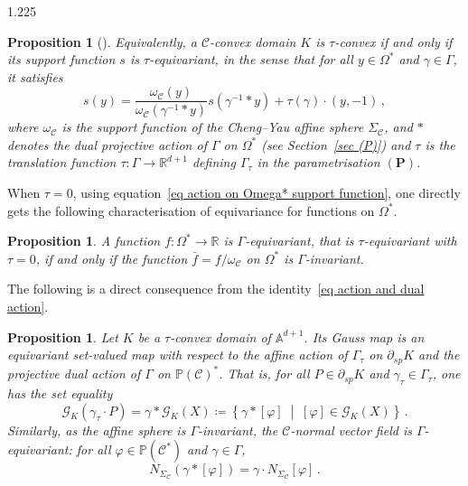 \documentclass[reqno, a4paper]{amsart}
\numberwithin{equation}{section}
\numberwithin{figure}{section}
\newtheorem{proposition}[theorem]{Proposition}
\theoremstyle{definition}
\theoremstyle{remark}
\newcommand{\R}{\mathbb{R}} %
\newcommand{\A}{\mathbb{A}} %
\renewcommand{\P}{\mathbb{P}} %
\newcommand{\C}{\mathcal{C}} %
\renewcommand{\S}{\Sigma_\C} %
\newcommand{\G}{\mathcal{G}} %
\newcommand{\st}{\; \middle\vert \;} %
\begin{document}
\begin{spacing}{1.225}
\begin{proposition}[{\cite[Corollary~5.7]{Ablondi_25}}]
Equivalently, a $\C$-convex domain $K$ is $\tau$-convex if and only if its support function $s$ is $\tau$-equivariant, in the sense that for all $y \in \Omega^*$ and $\gamma \in \Gamma$, it satisfies
\begin{equation}
\label{eq action on Omega* support function}
s(y) = \frac{\omega_\C(y)}{\omega_\C(\gamma^{-1}*y)}s(\gamma^{-1} * y)+ \tau(\gamma) \cdot (y,-1) \, ,
\end{equation}
where $\omega_\C$ is the support function of the Cheng--Yau affine sphere $\S$, and $*$ denotes the dual projective action of $\Gamma$ on $\Omega^*$ (see Section~\ref{sec (P)}) and $\tau $ is the translation function $\tau: \Gamma \to \R^{d+1}$ defining $\Gamma_\tau$ in the parametrisation $(\mathbf{P})$.
\end{proposition}

When $\tau =0$, using equation~\eqref{eq action on Omega* support function}, one directly gets the following characterisation of equivariance for functions on $\Omega^*$.

\begin{proposition}
\label{prop equiv and inv for function on Omega*}
A function $f : \Omega^* \to \R$ is $\Gamma$-equivariant, that is $\tau$-equivariant with $\tau =0$, if and only if the function $\bar{f} = f/\omega_\C$ on $\Omega^*$ is $\Gamma$-invariant.
\end{proposition}

The following is a direct consequence from the identity~\eqref{eq action and dual action}.

\begin{proposition}
\label{prop equivariance of the Gauss map}
Let $K$ be a $\tau$-convex domain of $\A^{d+1}$. Its Gauss map is an equivariant set-valued map with respect to the affine action of $\Gamma_\tau$ on $\partial_{sp} K$ and the projective dual action of $\Gamma$ on $\P(\C)^*$. That is, for all $P \in \partial_{sp} K$ and $\gamma_\tau \in \Gamma_\tau$, one has the set equality
\begin{equation*}
\G_K(\gamma_\tau \cdot P) = \gamma * \G_K(X) \coloneqq \left\lbrace \gamma * [\varphi] \st [\varphi] \in \G_K(X)\right\rbrace \, . 
\end{equation*}
Similarly, as the affine sphere is $\Gamma$-invariant, the $\C$-normal vector field is $\Gamma$-equivariant: for all $\varphi \in \P(\C^*)$ and $\gamma \in \Gamma$, 
\begin{equation*}
N_{\S}(\gamma * [\varphi]) = \gamma \cdot N_{\S}[\varphi]\, . 
\end{equation*}
\end{proposition}


\end{spacing}
\end{document}
